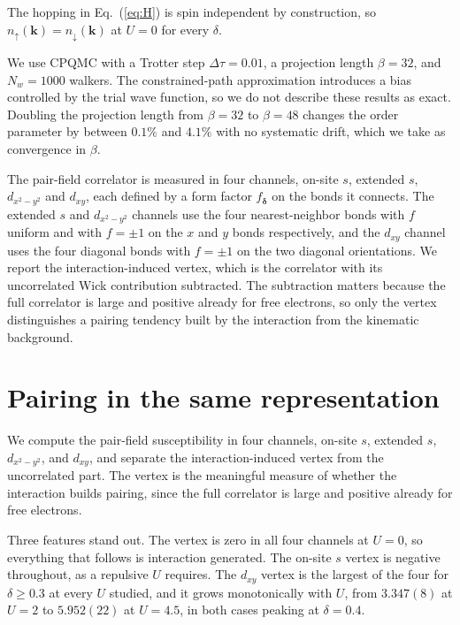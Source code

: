 \documentclass[aps,prb,reprint,superscriptaddress,amsmath,amssymb,floatfix]{revtex4-2}
\begin{document}
The hopping in Eq.~(\ref{eq:H}) is spin independent by construction, so
$n_{\uparrow}(\bm{k}) = n_{\downarrow}(\bm{k})$ at $U = 0$ for every $\delta$.

We use CPQMC with a Trotter step $\Delta\tau = 0.01$, a projection length
$\beta = 32$, and $N_w = 1000$ walkers. The constrained-path approximation
introduces a bias controlled by the trial wave function, so we do not describe
these results as exact. Doubling the projection length from $\beta = 32$ to
$\beta = 48$ changes the order parameter by between $0.1\%$ and $4.1\%$ with no
systematic drift, which we take as convergence in $\beta$.

The pair-field correlator is measured in four channels, on-site $s$, extended
$s$, $d_{x^2-y^2}$ and $d_{xy}$, each defined by a form factor
$f_{\bm{\delta}}$ on the bonds it connects. The extended $s$ and $d_{x^2-y^2}$
channels use the four nearest-neighbor bonds with $f$ uniform and with
$f = \pm 1$ on the $x$ and $y$ bonds respectively, and the $d_{xy}$ channel uses
the four diagonal bonds with $f = \pm 1$ on the two diagonal orientations. We
report the interaction-induced vertex, which is the correlator with its
uncorrelated Wick contribution subtracted. The subtraction matters because the
full correlator is large and positive already for free electrons, so only the
vertex distinguishes a pairing tendency built by the interaction from the
kinematic background.


\section{Pairing in the same representation}
\label{sec:pairing}

We compute the pair-field susceptibility in four channels, on-site $s$,
extended $s$, $d_{x^2-y^2}$, and $d_{xy}$, and separate the interaction-induced
vertex from the uncorrelated part. The vertex is the meaningful measure of
whether the interaction builds pairing, since the full correlator is large and
positive already for free electrons.

Three features stand out. The vertex is zero in all four channels at $U = 0$,
so everything that follows is interaction generated. The on-site $s$ vertex is
negative throughout, as a repulsive $U$ requires. The $d_{xy}$ vertex is the
largest of the four for $\delta \geq 0.3$ at every $U$ studied, and it grows
monotonically with $U$, from $3.347(8)$ at $U = 2$ to $5.952(22)$ at
$U = 4.5$, in both cases peaking at $\delta = 0.4$.
\end{document}
